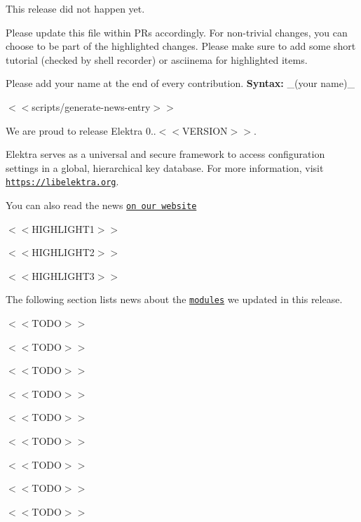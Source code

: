 This release did not happen yet.

Please update this file within P\+Rs accordingly. For non-\/trivial changes, you can choose to be part of the highlighted changes. Please make sure to add some short tutorial (checked by shell recorder) or asciinema for highlighted items.

Please add your name at the end of every contribution. {\bfseries Syntax\+:} \+\_\+(your name)\+\_\+

$<$$<${\ttfamily scripts/generate-\/news-\/entry}$>$$>$

We are proud to release Elektra 0..$<$$<$\+V\+E\+R\+S\+I\+O\+N$>$$>$.

Elektra serves as a universal and secure framework to access configuration settings in a global, hierarchical key database. For more information, visit \href{https://libelektra.org}{\tt https\+://libelektra.\+org}.

You can also read the news \href{https://www.libelektra.org/news/0.9.<<VERSION>>-release}{\tt on our website}


\begin{DoxyItemize}
\item $<$$<$\+H\+I\+G\+H\+L\+I\+G\+H\+T1$>$$>$
\item $<$$<$\+H\+I\+G\+H\+L\+I\+G\+H\+T2$>$$>$
\item $<$$<$\+H\+I\+G\+H\+L\+I\+G\+H\+T3$>$$>$
\end{DoxyItemize}

The following section lists news about the \href{https://www.libelektra.org/plugins/readme}{\tt modules} we updated in this release.


\begin{DoxyItemize}
\item $<$$<$\+T\+O\+D\+O$>$$>$
\item $<$$<$\+T\+O\+D\+O$>$$>$
\item $<$$<$\+T\+O\+D\+O$>$$>$
\end{DoxyItemize}


\begin{DoxyItemize}
\item $<$$<$\+T\+O\+D\+O$>$$>$
\item $<$$<$\+T\+O\+D\+O$>$$>$
\item $<$$<$\+T\+O\+D\+O$>$$>$
\end{DoxyItemize}


\begin{DoxyItemize}
\item $<$$<$\+T\+O\+D\+O$>$$>$
\item $<$$<$\+T\+O\+D\+O$>$$>$
\item $<$$<$\+T\+O\+D\+O$>$$>$
\end{DoxyItemize}

